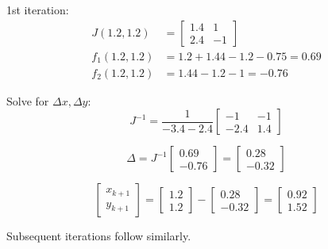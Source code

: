 \documentclass{article}
\begin{document}
1st iteration:
\begin{align*}
J(1.2, 1.2) &= \begin{bmatrix} 1.4 & 1 \\ 2.4 & -1 \end{bmatrix} \\
f_1(1.2, 1.2) &= 1.2 + 1.44 - 1.2 - 0.75 = 0.69 \\
f_2(1.2, 1.2) &= 1.44 - 1.2 - 1 = -0.76
\end{align*}

Solve for \( \Delta x, \Delta y \):
\[
J^{-1} = \frac{1}{-3.4 - 2.4} \begin{bmatrix} -1 & -1 \\ -2.4 & 1.4 \end{bmatrix}
\]

\[
\Delta = J^{-1} \begin{bmatrix} 0.69 \\ -0.76 \end{bmatrix} = \begin{bmatrix} 0.28 \\ -0.32 \end{bmatrix}
\]

\[
\begin{bmatrix} x_{k+1} \\ y_{k+1} \end{bmatrix} = \begin{bmatrix} 1.2 \\ 1.2 \end{bmatrix} - \begin{bmatrix} 0.28 \\ -0.32 \end{bmatrix} = \begin{bmatrix} 0.92 \\ 1.52 \end{bmatrix}
\]

Subsequent iterations follow similarly.



\end{document}
